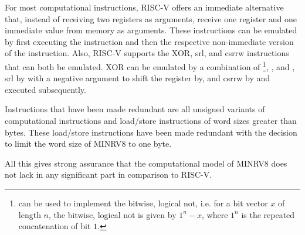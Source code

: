 For most computational instructions, RISC-V offers an immediate alternative that, instead of receiving two registers as arguments, receive one register and one immediate value from memory as arguments.
These instructions can be emulated by first executing the  instruction and then the respective non-immediate version of the instruction.
Also, RISC-V supports the XOR, \gls{srl}, and \gls{csrrw} instructions that can both be emulated.
XOR can be emulated by a combination of \footnote{%
     can be used to implement the bitwise, logical not, i.e. for a bit vector $ x $ of length $ n $, the bitwise, logical not is given by $ 1^n - x $, where $ 1^n $ is the repeated concatenation of bit $ 1 $.
}, , and , \gls{srl} by  with a negative argument to shift the register by, and \gls{csrrw} by  and  executed subsequently.

Instructions that have been made redundant are all unsigned variants of computational instructions and load/store instructions of word sizes greater than bytes.
These load/store instructions have been made redundant with the decision to limit the word size of MINRV8 to one byte.

All this gives strong assurance that the computational model of MINRV8 does not lack in any significant part in comparison to RISC-V.

